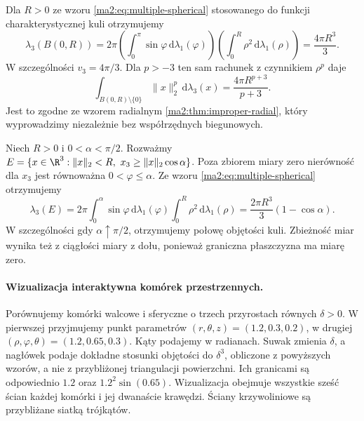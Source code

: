 \begin{przyklad}
\label{ma2:ex:multiple-ball-volume}
Dla $R>0$ ze wzoru \ref{ma2:eq:multiple-spherical}
stosowanego do funkcji charakterystycznej kuli
otrzymujemy
\[
 \lambda_3(B(0,R))=
 2\pi\left(\int_0^\pi\sin\varphi\,\mathrm d\lambda_1(\varphi)\right)
 \left(\int_0^R\rho^2\,\mathrm d\lambda_1(\rho)\right)
 =\frac{4\pi R^3}{3}.
\]
W szczególności $v_3=4\pi/3$. Dla $p>-3$
ten sam rachunek z czynnikiem $\rho^p$ daje
\[
 \int_{B(0,R)\setminus\{0\}}\|x\|_2^p\,
 \mathrm d\lambda_3(x)=\frac{4\pi R^{p+3}}{p+3}.
\]
Jest to zgodne ze wzorem radialnym
\ref{ma2:thm:improper-radial}, który wyprowadzimy
niezależnie bez współrzędnych biegunowych.
\end{przyklad}

\begin{przyklad}
\label{ma2:ex:multiple-spherical-sector}
Niech $R>0$ i $0<\alpha<\pi/2$. Rozważmy
$E=\{x\in\R^3:\|x\|_2<R,\ 
x_3\ge\|x\|_2\cos\alpha\}$.
Poza zbiorem miary zero nierówność dla $x_3$
jest równoważna $0<\varphi\le\alpha$.
Ze wzoru \ref{ma2:eq:multiple-spherical}
otrzymujemy
\[
 \lambda_3(E)=
 2\pi\int_0^\alpha\sin\varphi\,\mathrm d\lambda_1(\varphi)
 \int_0^R\rho^2\,\mathrm d\lambda_1(\rho)
 =\frac{2\pi R^3}{3}(1-\cos\alpha).
\]
W szczególności gdy $\alpha\uparrow\pi/2$,
otrzymujemy połowę objętości kuli. Zbieżność
miar wynika też z ciągłości miary z dołu,
ponieważ graniczna płaszczyzna ma miarę zero.
\end{przyklad}


\paragraph{Wizualizacja interaktywna komórek przestrzennych.}
Porównujemy komórki walcowe i sferyczne
o trzech przyrostach równych $\delta>0$.
W pierwszej przyjmujemy punkt parametrów
$(r,\theta,z)=(1.2,0.3,0.2)$, w drugiej
$(\rho,\varphi,\theta)=(1.2,0.65,0.3)$.
Kąty podajemy w radianach. Suwak zmienia
$\delta$, a nagłówek podaje dokładne
stosunki objętości do $\delta^3$,
obliczone z powyższych wzorów, a nie
z przybliżonej triangulacji powierzchni.
Ich granicami są odpowiednio $1.2$ oraz
$1.2^2\sin(0.65)$.
Wizualizacja obejmuje wszystkie sześć
ścian każdej komórki i jej dwanaście
krawędzi. Ściany krzywoliniowe są
przybliżane siatką trójkątów.

